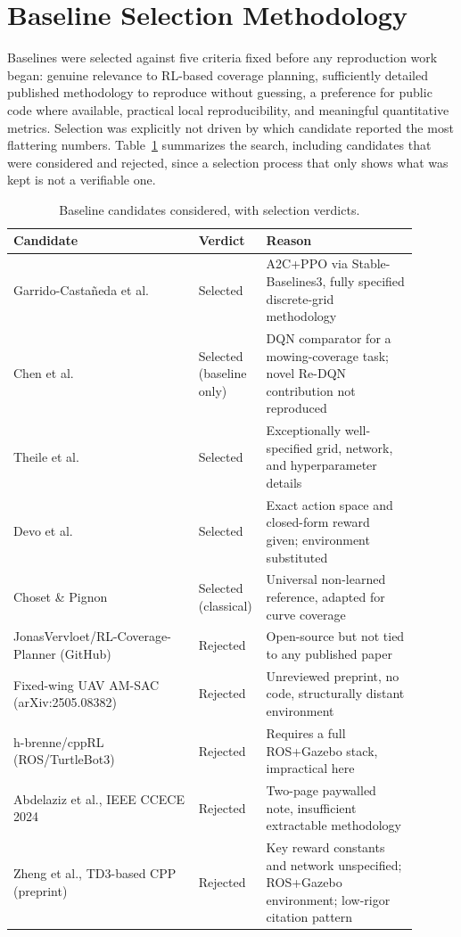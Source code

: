 \documentclass[conference]{IEEEtran}
\begin{document}
\section{Baseline Selection Methodology}
\label{sec:selection}

Baselines were selected against five criteria fixed before any reproduction work began: genuine relevance to RL-based coverage planning, sufficiently detailed published methodology to reproduce without guessing, a preference for public code where available, practical local reproducibility, and meaningful quantitative metrics. Selection was explicitly not driven by which candidate reported the most flattering numbers. Table~\ref{tab:selection} summarizes the search, including candidates that were considered and rejected, since a selection process that only shows what was kept is not a verifiable one.

\begin{table}[t]
\centering
\caption{Baseline candidates considered, with selection verdicts.}
\label{tab:selection}
\small
\begin{tabular}{@{}p{0.44\linewidth}p{0.1\linewidth}p{0.36\linewidth}@{}}
\toprule
Candidate & Verdict & Reason \\
\midrule
Garrido-Casta\~neda et al.~\cite{garrido2025rlcpp} & Selected & A2C+PPO via Stable-Baselines3, fully specified discrete-grid methodology \\
Chen et al.~\cite{chen2025redqn} & Selected (baseline only) & DQN comparator for a mowing-coverage task; novel Re-DQN contribution not reproduced \\
Theile et al.~\cite{theile2020uav} & Selected & Exceptionally well-specified grid, network, and hyperparameter details \\
Devo et al.~\cite{devo2022autonomous} & Selected & Exact action space and closed-form reward given; environment substituted \\
Choset \& Pignon~\cite{choset2000coverage} & Selected (classical) & Universal non-learned reference, adapted for curve coverage \\
JonasVervloet/RL-Coverage-Planner (GitHub) & Rejected & Open-source but not tied to any published paper \\
Fixed-wing UAV AM-SAC (arXiv:2505.08382) & Rejected & Unreviewed preprint, no code, structurally distant environment \\
h-brenne/cppRL (ROS/TurtleBot3) & Rejected & Requires a full ROS+Gazebo stack, impractical here \\
Abdelaziz et al., IEEE CCECE 2024 & Rejected & Two-page paywalled note, insufficient extractable methodology \\
Zheng et al., TD3-based CPP (preprint) & Rejected & Key reward constants and network unspecified; ROS+Gazebo environment; low-rigor citation pattern \\
\bottomrule
\end{tabular}
\end{table}
\end{document}
